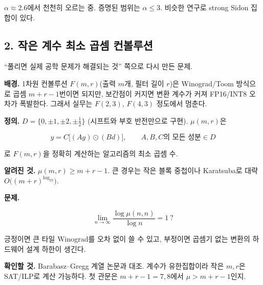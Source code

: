\(\alpha\approx2.6\)에서 천천히 오르는 중. 증명된 범위는 \(\alpha\le3\).
비슷한 연구로 strong Sidon 집합이 있다.

\subsection{2. 작은 계수 최소 곱셈 컨볼루션}

``풀리면 실제 공학 문제가 해결되는 것'' 쪽으로 다시 만든 문제.

\textbf{배경.} 1차원 컨볼루션 \(F(m,r)\)(출력 \(m\)개, 필터 길이
\(r\))은 Winograd/Toom 방식으로 곱셈 \(m+r-1\)번이면 되지만, 보간점이
커지면 변환 계수가 커져 FP16/INT8 오차가 폭발한다. 그래서 실무는
\(F(2,3)\), \(F(4,3)\) 정도에서 멈춘다.

\textbf{정의.} \(D=\{0,\pm1,\pm2,\pm\tfrac12\}\) (시프트와 부호
반전만으로 구현). \(\mu(m,r)\)은

\[
y=C\big[(Ag)\odot(Bd)\big],\qquad A,B,C\text{의 모든 성분}\in D
\]

로 \(F(m,r)\)을 정확히 계산하는 알고리즘의 최소 곱셈 수.

\textbf{알려진 것.} \(\mu(m,r)\ge m+r-1\). 큰 경우는 작은 블록 중첩이나
Karatsuba로 대략 \(O\big((m+r)^{\log_23}\big)\).

\textbf{문제.}

\[
\lim_{n\to\infty}\frac{\log\mu(n,n)}{\log n}=1\ ?
\]

긍정이면 큰 타일 Winograd를 오차 없이 쓸 수 있고, 부정이면 곱셈기 없는
변환의 하드웨어 설계 하한이 생긴다.

\textbf{확인할 것.} Barabasz--Gregg 계열 논문과 대조. 계수가
유한집합이라 작은 \(m,r\)은 SAT/ILP로 계산 가능하다. 첫 관문은
\(m+r-1=7,8\)에서 \(\mu>m+r-1\)인지.

